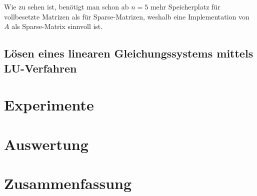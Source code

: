\documentclass{scrartcl}
\theoremstyle{remark}
\begin{document}

Wie zu sehen ist, benötigt man schon ab \(n = 5\) mehr Speicherplatz für vollbesetzte Matrizen als für Sparse-Matrizen, 
weshalb eine Implementation von \(A\) als Sparse-Matrix sinnvoll ist.
\subsection{Lösen eines linearen Gleichungssystems mittels LU-Verfahren}


\section{Experimente}



\section{Auswertung}






\section{Zusammenfassung}



\printbibliography
\end{document}
